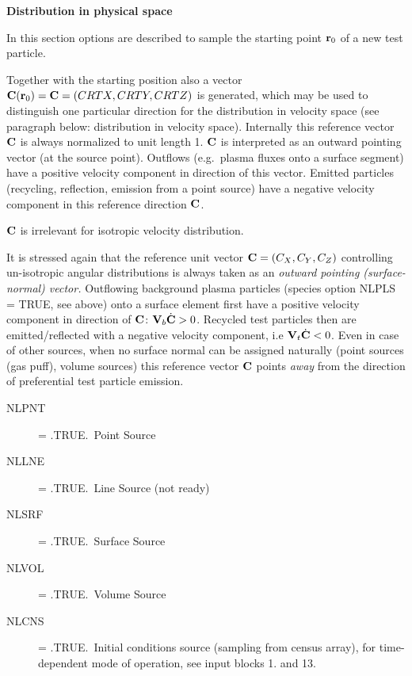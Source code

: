 \medskip

\textbf{Distribution in physical space} 

\medskip 

In this section options are described to sample the starting point $\mathbf{r}_0$ of a
new test particle.

Together with the starting position also a vector $\mathbf{C}(\mathbf{r}_0) = \mathbf{C} =
  (CRTX,CRTY,CRTZ)$ is generated, which may be used to distinguish one particular
direction for the distribution in velocity space (see paragraph below:
distribution in velocity space).
Internally this reference vector $\mathbf{C}$ is always normalized to unit length 1.
$\mathbf{C}$ is interpreted as an outward pointing vector (at the source point).
Outflows (e.g.\ plasma fluxes onto a surface segment) have a positive velocity
component in direction of this vector.
Emitted particles (recycling, reflection, emission from a point source) have a
negative velocity component in this reference direction $\mathbf{C}$.

$\mathbf{C}$ is irrelevant for isotropic velocity distribution.

It is stressed again that the reference unit vector $\mathbf{C} = (C_X,C_Y,C_Z)$
controlling un-isotropic angular distributions is always taken as an
\emph{outward pointing (surface-normal) vector.
}
Outflowing background plasma particles (species option NLPLS = TRUE, see above)
onto a surface element first have a positive velocity component in direction of
$\mathbf{C}$:	$\mathbf{V}_b \dot {\mathbf{C}} > 0$.
Recycled test particles then are emitted/reflected with a negative velocity
component, i.e	    $\mathbf{V}_t \dot {\mathbf{C}} < 0$.
Even in case of other sources, when no surface normal can be assigned naturally
(point sources (gas puff), volume sources) this reference vector $\mathbf{C}$ points
\emph{away} from the direction of preferential test particle emission.

\begin{description}
  \item[NLPNT] = .TRUE.\ Point Source
  \item[NLLNE] = .TRUE.\ Line Source	(not
        ready)
  \item[NLSRF] = .TRUE.\ Surface Source
  \item[NLVOL] = .TRUE.\ Volume
        Source
  \item[NLCNS] = .TRUE.\ Initial conditions source (sampling from census
        array), for time-depen\-dent mode of operation, see input blocks 1.
        and 13.
\end{description}

